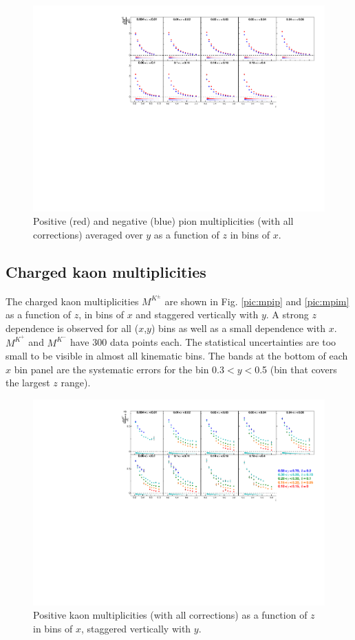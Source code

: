 \begin{figure}[!h]
  \centering
	\includegraphics[scale=0.85]{./gfx/piyavg.pdf}
	\caption{Positive (red) and negative (blue) pion multiplicities (with all corrections) averaged over $y$ as a function of $z$ in bins of $x$.}
	\label{pic:mpiyavg}
\end{figure}

\newpage

\subsection{Charged kaon multiplicities}

The charged kaon multiplicities $M^{K^{\pm}}$ are shown in Fig. \ref{pic:mpip} and \ref{pic:mpim} as a function of $z$, in bins of $x$ and staggered vertically with $y$. A strong $z$ dependence is observed for all ($x$,$y$) bins as well as a small dependence with $x$. $M^{K^+}$ and $M^{K^-}$ have 300 data points each. The statistical uncertainties are too small to be visible in almost all kinematic bins. The bands at the bottom of each $x$ bin panel are the systematic errors for the bin 0.3$< y <$0.5 (bin that covers the largest $z$ range).

\begin{figure}[!h]
  \centering
	\includegraphics[scale=0.85]{./gfx/Kp.pdf}
	\caption{Positive kaon multiplicities (with all corrections) as a function of $z$ in bins of $x$, staggered vertically with $y$.}
	\label{pic:mkp}
\end{figure}

